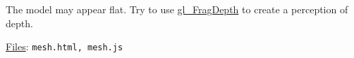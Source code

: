 \documentclass[addpoints]{exam}
\begin{document}
\begin{questions}

  The model may appear flat. Try to use \href{https://registry.khronos.org/OpenGL-Refpages/gl4/html/gl_FragDepth.xhtml}{gl\_FragDepth} to create a perception of depth.

  \underline{Files}: {\tt mesh.html, mesh.js}

\end{questions}
\end{document}
